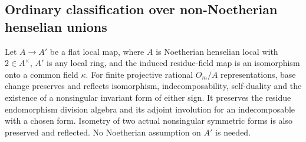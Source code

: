 \subsection{Ordinary classification over non-Noetherian henselian unions}
\label{C:henselian-flat-unions-subsection}

\begin{lemma}
\label{C:flat-local-residue-reflection}
Let $A\to A'$ be a flat local map, where $A$ is
Noetherian henselian local with $2\in A^\times$,
$A'$ is any local ring, and the induced residue-field
map is an isomorphism onto a common field $\kappa$.
For finite projective rational $O_m/A$ representations,
base change preserves and reflects isomorphism,
indecomposability, self-duality and the existence of a
nonsingular invariant form of either sign.
It preserves the residue endomorphism division algebra
and its adjoint involution for an indecomposable with a
chosen form.  Isometry of two actual nonsingular
symmetric forms is also preserved and reflected.
No Noetherian assumption on $A'$ is needed.
\end{lemma}

